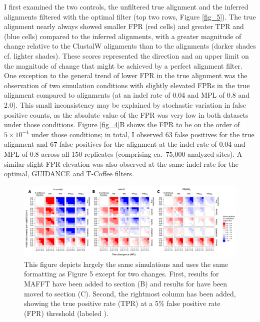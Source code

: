 I first examined the two controls, the unfiltered true alignment and
the inferred alignments filtered with the optimal filter (top two
rows, Figure \ref{fig_5}). The true alignment nearly always showed
smaller FPR (red cells) and greater TPR and \tpr (blue cells) compared
to the inferred alignments, with a greater magnitude of change
relative to the ClustalW alignments than to the \prankc alignments
(darker shades cf. lighter shades). These scores represented the
direction and an upper limit on the magnitude of change that might be
achieved by a perfect alignment filter. One exception to the general
trend of lower FPR in the true alignment was the observation of two
simulation conditions with slightly elevated FPRs in the true
alignment compared to \prankc alignments (at an indel rate of 0.04 and
MPL of 0.8 and 2.0). This small inconsistency may be explained by
stochastic variation in false positive counts, as the absolute value
of the FPR was very low in both datasets under those
conditions. Figure \ref{fig_4}B shows the FPR to be on the order of
$5\times10^{-4}$ under those conditions; in total, I observed 63
false positives for the true alignment and 67 false positives for the
\prankc alignment at the indel rate of 0.04 and MPL of 0.8 across all
150 replicates (comprising ca.\ 75,000 analyzed sites). A similar
slight FPR elevation was also observed at the same indel rate for the
optimal, GUIDANCE and T-Coffee filters.

\begin{landscape}
\begin{figure}
\centering
\includegraphics[scale=0.55]{Figs/supp_fig2.pdf}
\caption{This figure depicts largely the same simulations and uses the
  same formatting as Figure 5 except for two changes. First,
  results for MAFFT have been added to section (B) and results for
  \prankc have been moved to section (C). Second, the rightmost column
  has been added, showing the true positive rate (TPR) at a 5\% false
  positive rate (FPR) threshold (labeled \tprf).}
\label{fig_s2}
\end{figure}
\end{landscape}

